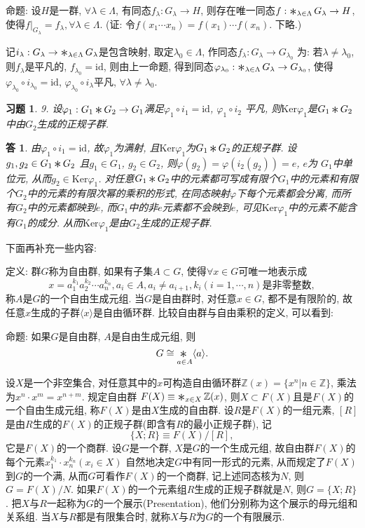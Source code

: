 \documentclass{ctexart}%
\newtheorem*{exercise}{习题}
\newtheorem*{solution}{答}
\theoremstyle{definition}
\theoremstyle{remark}
\newcommand{\Conv}{\mathop{\scalebox{1.5}{\raisebox{-0.2ex}{$\ast$}}}}%
\begin{document}
命题: 设$H$是一群, $\forall \lambda \in\Lambda$, 有同态$f_\lambda:G_{\lambda}\rightarrow H$, 则存在唯一同态$f: \Conv_{\lambda \in \Lambda} G_{\lambda}\rightarrow H$, 使得$f|_{G_{\lambda}} = f_{\lambda}, \forall \lambda \in \Lambda$. (证: 令$f(x_1\cdots x_n)=f(x_1)\cdots f(x_n)$. 下略.)

记$i_\lambda: G_\lambda \rightarrow \Conv_{\lambda \in \Lambda} G_\lambda$是包含映射, 取定$\lambda_0\in \Lambda$, 作同态$f_\lambda: G_\lambda \rightarrow G_{\lambda_0}$ 为: 若$\lambda \neq \lambda_0$, 则$f_{\lambda}$是平凡的, $f_{\lambda_0} = \text{id}$, 则由上一命题, 得到同态$\varphi_{\lambda_0}: \Conv_{\lambda \in \Lambda} G_\lambda \rightarrow G_{\lambda_0}$, 使得$\varphi_{\lambda_0}\circ i_{\lambda_0} = \text{id}$, $\varphi_{\lambda_0} \circ i_\lambda$平凡, $\forall \lambda\neq \lambda_0$. 

\begin{exercise}9. 设$\varphi_1 : G_1\Conv G_2 \rightarrow G_1$满足$\varphi_1\circ i_1 = \text{id}$, $\varphi_1 \circ i_2$ 平凡, 则$\text{Ker}\varphi_1$是$G_1\Conv G_2$中由$G_2$生成的正规子群. 
\end{exercise}
\begin{solution}
由$\varphi_1\circ i_1=\text{id}$, 故$\varphi_1$为满射, 且$\text{Ker} \varphi_1$为$G_1\Conv G_2$的正规子群. 设$g_1,g_2\in G_1\Conv G_2$ 且$g_1 \in G_1$, $g_2\in G_2$, 则$\varphi(g_2)= \varphi(i_2(g_2)) = e$, $e$为 $G_1$中单位元, 从而$g_2\in \text{Ker} \varphi_1$. 对任意$G_1\Conv G_2$中的元素都可写成有限个$G_1$中的元素和有限个$G_2$中的元素的有限次幂的乘积的形式, 在同态映射$\varphi$下每个元素都会分离, 而所有$G_2$中的元素都映到$e$, 而$G_1$中的非$e$元素都不会映到$e$, 可见$\text{Ker}\varphi_1$中的元素不能含有$G_1$的成分. 从而$\text{Ker}\varphi_1$是由$G_2$生成的正规子群. 
\end{solution}

下面再补充一些内容:


定义: 群$G$称为自由群, 如果有子集$A\subset G$, 使得$\forall x\in G$可唯一地表示成
$$ x= a^{k_1}_1a^{k_2}_2\cdots a^{k_n}_n, a_i \in A, a_i\neq a_{i+1}, k_i(i=1,\cdots, n)\text{是非零整数},$$
称$A$是$G$的一个自由生成元组. 当$G$是自由群时, 对任意$x\in G$, 都不是有限阶的, 故任意$x$生成的子群$\langle x\rangle$是自由循环群. 比较自由群与自由乘积的定义, 可以看到:

命题: 如果$G$是自由群, $A$是自由生成元组, 则 
$$G\cong \Conv_{a\in A} \langle a\rangle.$$

设$X$是一个非空集合, 对任意其中的$x$可构造自由循环群$\mathbb{Z}(x)=\{x^n|n\in \mathbb{Z}\}$, 乘法为$x^n\cdot x^m = x^{n+m}$. 规定自由群 $F(X)\equiv \Conv_{x\in X} \mathbb{Z}(x)$, 则$X\subset F(X)$且是$F(X)$的一个自由生成元组, 称$F(X)$是由$X$生成的自由群. 设$R$是$F(X)$的一组元素, $[R]$是由$R$生成的$F(X)$的正规子群(即含有$R$的最小正规子群), 记
$$\{X;R\} \equiv F(X)/[R],$$
它是$F(X)$的一个商群. 设$G$是一个群, $X$是$G$的一个生成元组, 故自由群$F(X)$的每个元素$x^{k_1}_1\cdot x^{k_n}_n (x_i \in X)$ 自然地决定$G$中有同一形式的元素, 从而规定了$F(X)$到$G$的一个满, 从而$G$可看作$F(X)$的一个商群, 记上述同态核为$N$, 则$G=F(X)/N$. 如果$F(X)$的一个元素组$R$生成的正规子群就是$N$, 则$G=\{X;R\}$. 把$X$与$R$一起称为$G$的一个展示(Presentation), 他们分别称为这个展示的母元组和关系组. 当$X$与$R$都是有限集合时, 就称$X$与$R$为$G$的一个有限展示.
\end{document}
